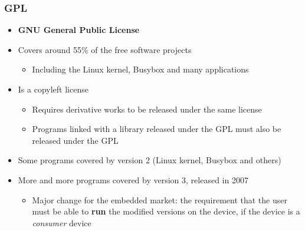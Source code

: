 \begin{frame}
  \frametitle{GPL}
  \begin{itemize}
  \item {\bf GNU General Public License}
  \item Covers around 55\% of the free software projects
    \begin{itemize}
    \item Including the Linux kernel, Busybox and many applications
    \end{itemize}
  \item Is a copyleft license
    \begin{itemize}
    \item Requires derivative works to be released under the same
      license
    \item Programs linked with a library released under the GPL must
      also be released under the GPL
    \end{itemize}
  \item Some programs covered by version 2 (Linux kernel, Busybox and
    others)
  \item More and more programs covered by version 3, released in 2007
    \begin{itemize}
    \item Major change for the embedded market: the requirement that
      the user must be able to {\bf run} the modified versions on the
      device, if the device is a {\em consumer} device
    \end{itemize}
  \end{itemize}
\end{frame}

